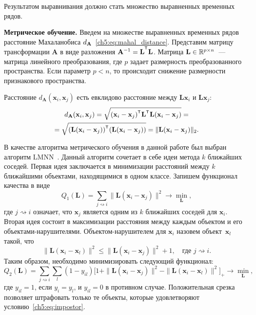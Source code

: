 \documentclass[11pt, a5paper]{dissert}
\begin{document}
Результатом выравнивания должно стать множество выравненных временных рядов.

\textbf{Метрическое обучение.}
Введем на множестве выравненных временных рядов расстояние Махаланобиса $d_{\mathbf{A}}$~\ref{ch5:eq:mahal_distance}.
Представим матрицу трансформации $\mathbf{A}$ в виде разложения $\mathbf{A}^{-1} = \mathbf{L}^{\T}  \mathbf{L}$.
Матрица $\mathbf{L} \in \mathbb{R}^{p \times n}$~--- матрица линейного преобразования, где $p$ задает размерность преобразованного пространства. Если параметр $p < n$, то происходит снижение размерности признакового пространства.

Расстояние $d_\mathbf{A} (\mathbf{x}_i, \mathbf{x}_j)$ есть евклидово расстояние между $\mathbf{Lx}_i$ и $\mathbf{Lx}_j$:
\begin{multline*}
	d_\mathbf{A} (\mathbf{x}_i, \mathbf{x}_j) = \sqrt{(\mathbf{x}_i - \mathbf{x}_j)^{\T} \mathbf{L}^{\T} \mathbf{L} (\mathbf{x}_i - \mathbf{x}_j)} = \\= \sqrt{(\mathbf{L} (\mathbf{x}_i - \mathbf{x}_j))^{\T} (\mathbf{L} (\mathbf{x}_i - \mathbf{x}_j))} = \|\mathbf{L} (\mathbf{x}_i - \mathbf{x}_j)\|_2.
\end{multline*}

В качестве алгоритма метрического обучения в данной работе был выбран алгоритм LMNN~\cite{weinberger2009distance}. 
Данный алгоритм сочетает в себе идеи метода $k$ ближайших соседей. 
Первая идея заключается в минимизации расстояний между $k$ ближайшими объектами, находящимися в одном классе. 
Запишем функционал качества в виде
\[
	Q_1(\mathbf{L}) = \sum_{j \rightsquigarrow i} \|\mathbf{L}(\mathbf{x}_i - \mathbf{x}_j)\|^2 \rightarrow \min_{\mathbf{L}},
\]
где $j \rightsquigarrow i$ означает, что $\mathbf{x}_j$ является одним из $k$ ближайших соседей для $\mathbf{x}_i$.
Вторая идея состоит в максимизации расстояния между каждым объектом и его объектами-нарушителями. Объектом-нарушителем для $\mathbf{x}_i$ назовем объект~$\mathbf{x}_l$ такой, что
\begin{equation}
	\label{ch5:eq:impostor}
	\|\mathbf{L}(\mathbf{x}_i - \mathbf{x}_l)\|^2 \leq \|\mathbf{L}(\mathbf{x}_i - \mathbf{x}_j)\|^2 + 1, \quad \text{где $j \rightsquigarrow i$}.
\end{equation}
Таким образом, необходимо минимизировать следующий функционал:
\[
	Q_2(\mathbf{L}) = \sum_{j \rightsquigarrow i} \sum_l(1 - y_{il})\bigl[1 + \|\mathbf{L}(\mathbf{x}_i - \mathbf{x}_j)\|^2 - \|\mathbf{L}(\mathbf{x}_i - \mathbf{x}_l)\|^2\bigr]_+ \rightarrow \min_{\mathbf{L}},
\]
где $y_{il} = 1$, если $y_i = y_l$, и $y_{il} = 0$ в противном случае.
Положительная срезка позволяет штрафовать только те объекты, которые удовлетворяют условию~\eqref{ch5:eq:impostor}.
\end{document}
